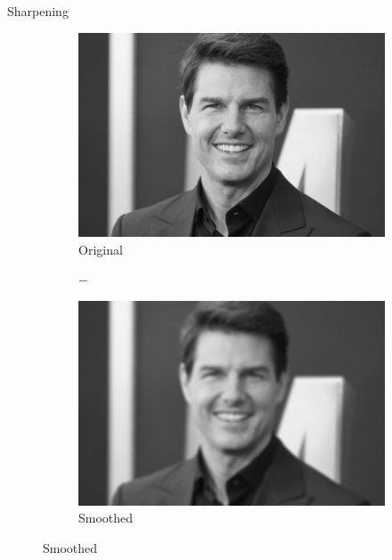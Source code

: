 \begin{frame}{Sharpening}
    \begin{figure}
        \centering
        \begin{subfigure}[b]{0.25\textwidth}
            \includegraphics[width=\textwidth]{./figures/sharpening_original.jpg}
            \caption{Original}
            \label{sfi:sharpening_original}
        \end{subfigure}
        \begin{subfigure}[b]{0.05\textwidth}
            \centering
            $-$
            \vspace{2cm}
        \end{subfigure}
        \begin{subfigure}[b]{0.25\textwidth}
            \includegraphics[width=\textwidth]{./figures/sharpening_blurred.jpg}
            \caption{Smoothed}
            \label{sfi:sharpening_blurred}

\end{subfigure}
\end{figure}
\end{frame}
